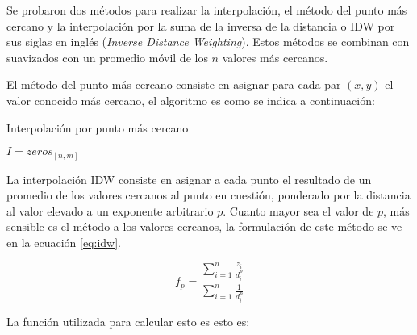 Se probaron dos métodos para realizar la interpolación, el método del punto
más cercano y la interpolación por la suma de la inversa de la distancia o 
IDW por sus siglas en inglés (\emph{Inverse Distance Weighting}).
%
Estos métodos se combinan con suavizados con un promedio móvil de los $n$
valores más cercanos.

El método del punto más cercano consiste en asignar para cada par $(x, y)$
el valor conocido más cercano, el algoritmo es como se indica a continuación:

\begin{algorithm}
 \caption{Interpolación por punto más cercano}
 \label{algo:mas_cercano}
    \SetAlgoLined



    \BlankLine
     $I=zeros_{[n,m]}$\;
\end{algorithm}

La interpolación IDW consiste en asignar a cada punto el resultado de un promedio
de los valores cercanos al punto en cuestión, ponderado por la distancia al valor
elevado a un exponente arbitrario $p$.
%
Cuanto mayor sea el valor de $p$, más sensible es el método a los valores cercanos,
la formulación de este método se ve en la ecuación \ref{eq:idw}.

\begin{equation}
    f_p = \frac{\sum_{i=1}^{n} \frac{z_i}{d_i^p}} {\sum_{i=1}^{n} \frac{1}{d_i^p}}
    \label{eq:idw}
\end{equation}

La función utilizada para calcular esto es esto es:

